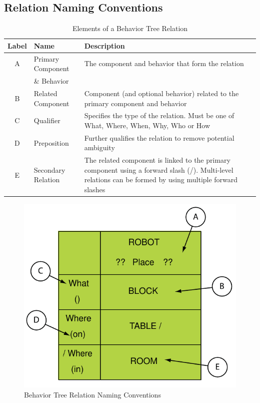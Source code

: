 \documentclass[]{article}
\begin{document}
\subsection{Relation Naming Conventions}

\begin{table}
\begin{tabularx}{\textwidth}{|c|l|X|}
 \textbf{Label} & \textbf{Name} & \textbf{Description}\\ \hline
A & Primary Component &The component and behavior that form the relation\\ \hline
& \& Behavior &\\ \hline
B &Related Component & Component (and optional behavior) related to the primary component and behavior\\ \hline
C &Qualifier & Specifies the type of the relation. Must be one of What, Where, When, Why, Who or How\\ \hline
D &Preposition & Further qualifies the relation to remove potential ambiguity\\ \hline
E &Secondary Relation & The related component is linked to the primary component using a forward slash (/). Multi-level relations can be formed by using multiple forward slashes
\end{tabularx}


\caption{Elements of a Behavior Tree Relation}
\label{tbl:RelationElements}
\end{table}

\begin{figure}
\includegraphics{figs/AppendixB/Naming/Relation}
\caption{Behavior Tree Relation Naming Conventions}
\label{fig:RelationNaming}
\end{figure}
\end{document}
